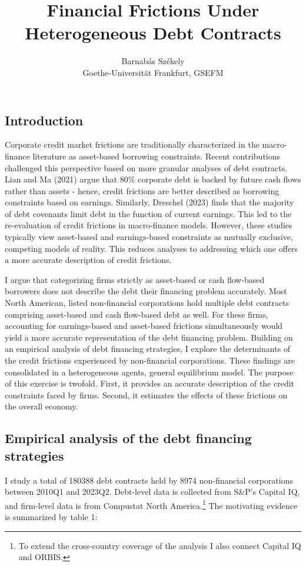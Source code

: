 \documentclass[12pt]{article}
\title{Financial Frictions Under Heterogeneous Debt Contracts}
\author{Barnabás Székely \\ \small  Goethe-Universität Frankfurt, GSEFM}
\date{}
\begin{document}
\maketitle

\subsection*{Introduction} \label{sec:introduction}

Corporate credit market frictions are traditionally characterized in the macro-finance literature as asset-based borrowing constraints. Recent contributions challenged this perspective based on more granular analyses of debt contracts. Lian and Ma (2021) argue that 80\% corporate debt is backed by future cash flows rather than assets - hence, credit frictions are better described as borrowing constraints based on earnings. Similarly, Dreschel (2023) finds that the majority of debt covenants limit debt in the function of current earnings. This led to the re-evaluation of credit frictions in macro-finance models. However, these studies typically view asset-based and earnings-based constraints as mutually exclusive, competing models of reality. This reduces analyses to addressing which one offers a more accurate description of credit frictions.  

I argue that categorizing firms strictly as asset-based or cash flow-based borrowers does not describe the debt their financing problem accurately. Most North American, listed non-financial corporations hold multiple debt contracts comprising asset-based and cash flow-based debt as well. For these firms, accounting for earnings-based and asset-based frictions simultaneously would yield a more accurate representation of the debt financing problem. Building on an empirical analysis of debt financing strategies, I explore the determinants of the credit frictions experienced by non-financial corporations. These findings are consolidated in a heterogeneous agents, general equilibrium model. The purpose of this exercise is twofold. First, it provides an accurate description of the credit constraints faced by firms. Second, it estimates the effects of these frictions on the overall economy. 

\subsection*{Empirical analysis of the debt financing strategies}
I study a total of 180388 debt contracts held by 8974 non-financial corporations between 2010Q1 and 2023Q2. Debt-level data is collected from S\&P's Capital IQ, and firm-level data is from Compustat North America.\footnote{To extend the cross-country coverage of the analysis I also connect Capital IQ and ORBIS.} The motivating evidence is summarized by table 1: 
\end{document}
